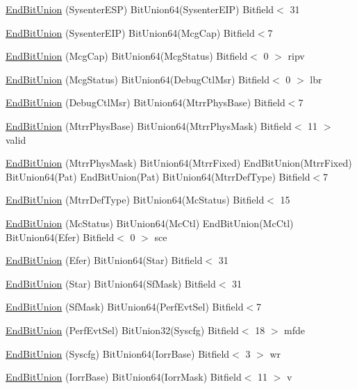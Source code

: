 \begin{DoxyCompactItemize}
\item 
\hyperlink{namespaceX86ISA_ab76cf8e722dcf9a853dc8ef123aeda8a}{EndBitUnion} (SysenterESP) BitUnion64(SysenterEIP) Bitfield$<$ 31
\item 
\hyperlink{namespaceX86ISA_a11cd84b3d92d7451d3a3d3c2a36d8763}{EndBitUnion} (SysenterEIP) BitUnion64(McgCap) Bitfield$<$7
\item 
\hyperlink{namespaceX86ISA_a74677b253e3ee39aae0941f8ec5d2bd0}{EndBitUnion} (McgCap) BitUnion64(McgStatus) Bitfield$<$ 0 $>$ ripv
\item 
\hyperlink{namespaceX86ISA_a502085fd93bf084e4ade6c567c3c766f}{EndBitUnion} (McgStatus) BitUnion64(DebugCtlMsr) Bitfield$<$ 0 $>$ lbr
\item 
\hyperlink{namespaceX86ISA_a63612265d014f8c5c3a82013db316e2a}{EndBitUnion} (DebugCtlMsr) BitUnion64(MtrrPhysBase) Bitfield$<$7
\item 
\hyperlink{namespaceX86ISA_a104adc3f41d2497c9d77064215abdf8f}{EndBitUnion} (MtrrPhysBase) BitUnion64(MtrrPhysMask) Bitfield$<$ 11 $>$ valid
\item 
\hyperlink{namespaceX86ISA_ada1121919d9bca5206c4fda19dcb1cd3}{EndBitUnion} (MtrrPhysMask) BitUnion64(MtrrFixed) EndBitUnion(MtrrFixed) BitUnion64(Pat) EndBitUnion(Pat) BitUnion64(MtrrDefType) Bitfield$<$7
\item 
\hyperlink{namespaceX86ISA_af1aa75957bd1b168f5e292fbe13b2465}{EndBitUnion} (MtrrDefType) BitUnion64(McStatus) Bitfield$<$ 15
\item 
\hyperlink{namespaceX86ISA_a79917c072640e1ffeaeeb0e615248677}{EndBitUnion} (McStatus) BitUnion64(McCtl) EndBitUnion(McCtl) BitUnion64(Efer) Bitfield$<$ 0 $>$ sce
\item 
\hyperlink{namespaceX86ISA_a0a2f3997f942dfaad353244cee4d010e}{EndBitUnion} (Efer) BitUnion64(Star) Bitfield$<$ 31
\item 
\hyperlink{namespaceX86ISA_a668f00fcbee02b4d057d64c22cf7e7a5}{EndBitUnion} (Star) BitUnion64(SfMask) Bitfield$<$ 31
\item 
\hyperlink{namespaceX86ISA_ab054845e6a36ccb566b48f94aeca21b4}{EndBitUnion} (SfMask) BitUnion64(PerfEvtSel) Bitfield$<$7
\item 
\hyperlink{namespaceX86ISA_a674759d7fc5b550a2c5c3f75868aac1f}{EndBitUnion} (PerfEvtSel) BitUnion32(Syscfg) Bitfield$<$ 18 $>$ mfde
\item 
\hyperlink{namespaceX86ISA_a86836e0b0df079086efece4cf5410455}{EndBitUnion} (Syscfg) BitUnion64(IorrBase) Bitfield$<$ 3 $>$ wr
\item 
\hyperlink{namespaceX86ISA_a499ad5e25e1190d0a731e36f86a74bfc}{EndBitUnion} (IorrBase) BitUnion64(IorrMask) Bitfield$<$ 11 $>$ v

\end{DoxyCompactItemize}
